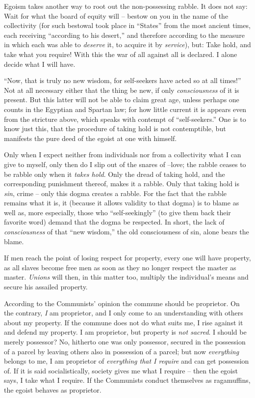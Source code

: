 Egoism takes another way to root out the non-possessing rabble. It does not 
say: Wait for what the board of equity will -- bestow on you in the name of 
the collectivity (for such bestowal took place in ``States'' from the most 
ancient times, each receiving ``according to his desert,'' and therefore 
according to the measure in which each was able to \textit{deserve} it, to 
acquire it by \textit{service}), but: Take hold, and take what you require! 
With this the war of all against all is declared. I alone decide what I will 
have.

``Now, that is truly no new wisdom, for self-seekers have acted so at all 
times!'' Not at all necessary either that the thing be new, if only 
\textit{consciousness} of it is present. But this latter will not be able to 
claim great age, unless perhaps one counts in the Egyptian and Spartan law; 
for how little current it is appears even from the stricture above, which 
speaks with contempt of ``self-seekers.'' One is to know just this, that the 
procedure of taking hold is not contemptible, but manifests the pure deed of 
the egoist at one with himself.

Only when I expect neither from individuals nor from a collectivity what I can 
give to myself, only then do I slip out of the snares of --love; the rabble 
ceases to be rabble only when it \textit{takes hold}. Only the dread of taking 
hold, and the corresponding punishment thereof, makes it a rabble. Only that 
taking hold is \textit{sin}, crime -- only this dogma creates a rabble. For 
the fact that the rabble remains what it is, it (because it allows validity to 
that dogma) is to blame as well as, more especially, those who 
``self-seekingly'' (to give them back their favorite word) demand that the 
dogma be respected. In short, the lack of \textit{consciousness} of that 
``new wisdom,'' the old consciousness of sin, alone bears the blame.

If men reach the point of losing respect for property, every one will have 
property, as all slaves become free men as soon as they no longer respect the 
master as master. \textit{Unions} will then, in this matter too, multiply the 
individual's means and secure his assailed property.

According to the Communists' opinion the commune should be proprietor. On the 
contrary, \textit{I} am proprietor, and I only come to an understanding with 
others about my property. If the commune does not do what suits me, I rise 
against it and defend my property. I am proprietor, but property is 
\textit{not sacred}. I should be merely possessor? No, hitherto one was only 
possessor, secured in the possession of a parcel by leaving others also in 
possession of a parcel; but now \textit{everything} belongs to me, I am 
proprietor of \textit{everything that I require} and can get possession of. If 
it is said socialistically, society gives me what I require -- then the egoist 
says, I take what I require. If the Communists conduct themselves as 
ragamuffins, the egoist behaves as proprietor.

